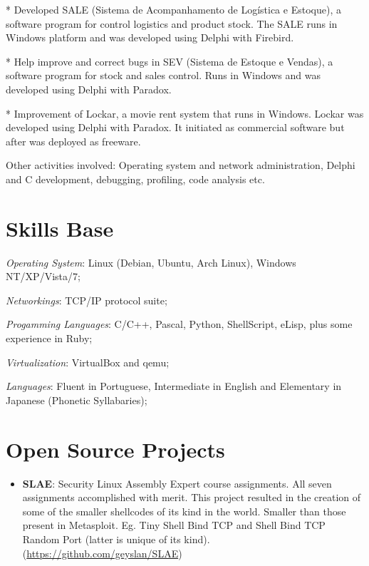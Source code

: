 \documentclass[margin]{res}
\begin{document}
\begin{resume}
      * Developed SALE (Sistema de Acompanhamento de Logística e Estoque), a software program for control logistics and
        product stock. The SALE runs in Windows platform and was developed using Delphi with Firebird.

      * Help improve and correct bugs in SEV (Sistema de Estoque e Vendas), a software program for stock and sales control.
        Runs in Windows and was developed using Delphi with Paradox.

      * Improvement of Lockar, a movie rent system that runs in Windows. Lockar was developed using Delphi with Paradox.
        It initiated as commercial software but after was deployed as freeware.

      Other activities involved: Operating system and network administration, Delphi and C development, debugging, profiling,
      code analysis etc.

\section{Skills Base} \textit{Operating System}: Linux (Debian, Ubuntu, Arch Linux), Windows NT/XP/Vista/7;

			\textit{Networkings}: TCP/IP protocol suite;

			\textit{Progamming Languages}: C/C++, Pascal, Python, ShellScript, eLisp, plus some experience in Ruby;

			\textit{Virtualization}: VirtualBox and qemu;

			\textit{Languages}: Fluent in Portuguese, Intermediate in English and Elementary in Japanese (Phonetic
                                            Syllabaries);

\section{Open Source Projects}
		\begin{itemize}
                    \item \textbf{SLAE}: Security Linux Assembly Expert course assignments. All seven assignments accomplished with
                                         merit. This project resulted in the creation of some of the smaller shellcodes of its kind
                                         in the world. Smaller than those present in Metasploit. Eg. Tiny Shell Bind TCP and Shell Bind
                                         TCP Random Port (latter is unique of its kind).\newline
                                         (\url{https://github.com/geyslan/SLAE})\vspace{1mm}


\end{itemize}
\end{resume}
\end{document}
